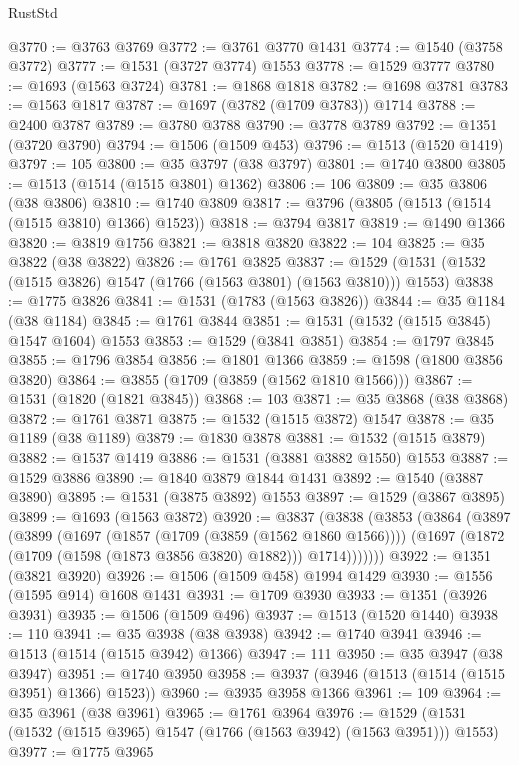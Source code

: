\begin{lexlean}{RustStd}
\begin{coremodule}
{\begin{coremodule}
{{{{{{{{{{{{{{{{{{{{{{{{{{{{{{{{@3770 := @3763 @3769
@3772 := @3761 @3770 @1431
@3774 := @1540 (@3758 @3772)
@3777 := @1531 (@3727 @3774) @1553
@3778 := @1529 @3777
@3780 := @1693 (@1563 @3724)
@3781 := @1868 @1818
@3782 := @1698 @3781
@3783 := @1563 @1817
@3787 := @1697 (@3782 (@1709 @3783)) @1714
@3788 := @2400 @3787
@3789 := @3780 @3788
@3790 := @3778 @3789
@3792 := @1351 (@3720 @3790)
@3794 := @1506 (@1509 @453)
@3796 := @1513 (@1520 @1419)
@3797 := 105
@3800 := @35 @3797 (@38 @3797)
@3801 := @1740 @3800
@3805 := @1513 (@1514 (@1515 @3801) @1362)
@3806 := 106
@3809 := @35 @3806 (@38 @3806)
@3810 := @1740 @3809
@3817 := @3796 (@3805 (@1513 (@1514 (@1515 @3810) @1366) @1523))
@3818 := @3794 @3817
@3819 := @1490 @1366
@3820 := @3819 @1756
@3821 := @3818 @3820
@3822 := 104
@3825 := @35 @3822 (@38 @3822)
@3826 := @1761 @3825
@3837 := @1529 (@1531 (@1532 (@1515 @3826) @1547 (@1766 (@1563 @3801) (@1563 @3810))) @1553)
@3838 := @1775 @3826
@3841 := @1531 (@1783 (@1563 @3826))
@3844 := @35 @1184 (@38 @1184)
@3845 := @1761 @3844
@3851 := @1531 (@1532 (@1515 @3845) @1547 @1604) @1553
@3853 := @1529 (@3841 @3851)
@3854 := @1797 @3845
@3855 := @1796 @3854
@3856 := @1801 @1366
@3859 := @1598 (@1800 @3856 @3820)
@3864 := @3855 (@1709 (@3859 (@1562 @1810 @1566)))
@3867 := @1531 (@1820 (@1821 @3845))
@3868 := 103
@3871 := @35 @3868 (@38 @3868)
@3872 := @1761 @3871
@3875 := @1532 (@1515 @3872) @1547
@3878 := @35 @1189 (@38 @1189)
@3879 := @1830 @3878
@3881 := @1532 (@1515 @3879)
@3882 := @1537 @1419
@3886 := @1531 (@3881 @3882 @1550) @1553
@3887 := @1529 @3886
@3890 := @1840 @3879 @1844 @1431
@3892 := @1540 (@3887 @3890)
@3895 := @1531 (@3875 @3892) @1553
@3897 := @1529 (@3867 @3895)
@3899 := @1693 (@1563 @3872)
@3920 := @3837
    (@3838
      (@3853
        (@3864
          (@3897
            (@3899
              (@1697
                (@1857 (@1709 (@3859 (@1562 @1860 @1566))))
                (@1697 (@1872 (@1709 (@1598 (@1873 @3856 @3820) @1882))) @1714)))))))
@3922 := @1351 (@3821 @3920)
@3926 := @1506 (@1509 @458) @1994 @1429
@3930 := @1556 (@1595 @914) @1608 @1431
@3931 := @1709 @3930
@3933 := @1351 (@3926 @3931)
@3935 := @1506 (@1509 @496)
@3937 := @1513 (@1520 @1440)
@3938 := 110
@3941 := @35 @3938 (@38 @3938)
@3942 := @1740 @3941
@3946 := @1513 (@1514 (@1515 @3942) @1366)
@3947 := 111
@3950 := @35 @3947 (@38 @3947)
@3951 := @1740 @3950
@3958 := @3937 (@3946 (@1513 (@1514 (@1515 @3951) @1366) @1523))
@3960 := @3935 @3958 @1366
@3961 := 109
@3964 := @35 @3961 (@38 @3961)
@3965 := @1761 @3964
@3976 := @1529 (@1531 (@1532 (@1515 @3965) @1547 (@1766 (@1563 @3942) (@1563 @3951))) @1553)
@3977 := @1775 @3965
}}}}}}}}}}}}}}}}}}}}}}}}}}}}}}}}
\end{coremodule}}
\end{coremodule}
\end{lexlean}
